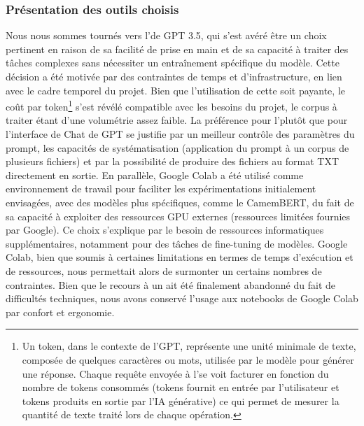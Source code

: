 \subsubsection{Présentation des outils choisis}
Nous nous sommes tournés vers l’\api de GPT 3.5, qui s'est avéré être un choix pertinent en raison de sa facilité de prise en main et de sa capacité à traiter des tâches complexes sans nécessiter un entraînement spécifique du modèle. Cette décision a été motivée par des contraintes de temps et d'infrastructure, en lien avec le cadre temporel du projet. Bien que l’utilisation de cette \api soit payante, le coût par token\footnote{Un token, dans le contexte de l’\api GPT, représente une unité minimale de texte, composée de quelques caractères ou mots, utilisée par le modèle pour générer une réponse. Chaque requête envoyée à l’\api se voit facturer en fonction du nombre de tokens consommés (tokens fournit en entrée par l’utilisateur et tokens produits en sortie par l’IA générative) ce qui permet de mesurer la quantité de texte traité lors de chaque opération.} s’est révélé compatible avec les besoins du projet, le corpus à traiter étant d’une volumétrie assez faible. La préférence pour l’\api plutôt que pour l’interface de Chat de GPT se justifie par un meilleur contrôle des paramètres du prompt, les capacités de systématisation (application du prompt à un corpus de plusieurs fichiers) et par la possibilité de produire des fichiers au format TXT directement en sortie. 
En parallèle, Google Colab a été utilisé comme environnement de travail pour faciliter les expérimentations initialement envisagées, avec des modèles plus spécifiques, comme le \mlm CamemBERT, du fait de sa capacité à exploiter des ressources GPU externes (ressources limitées fournies par Google). Ce choix s’explique par le besoin de ressources informatiques supplémentaires, notamment pour des tâches de fine-tuning de modèles. Google Colab, bien que soumis à certaines limitations en termes de temps d’exécution et de ressources, nous permettait alors de surmonter un certains nombres de contraintes. Bien que le recours à un \mlm ait été finalement abandonné du fait de difficultés techniques, nous avons conservé l’usage aux notebooks de Google Colab par confort et ergonomie.

